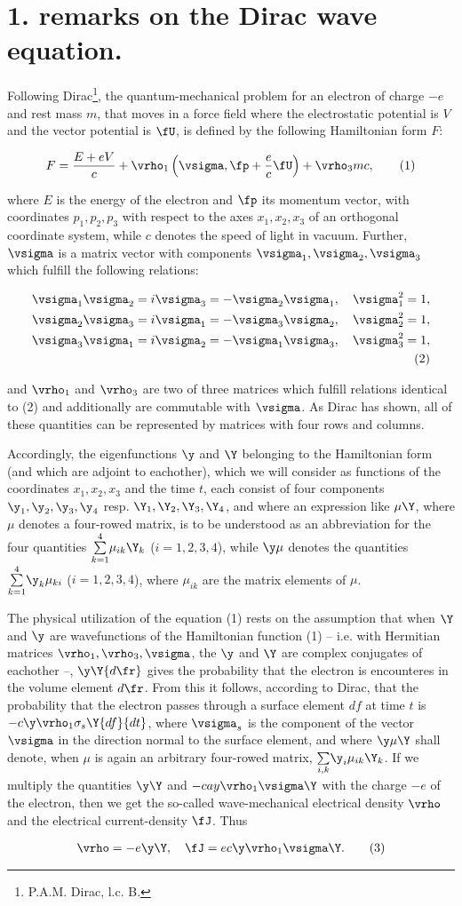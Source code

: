 \documentclass{article}
\newcommand{\nequ}[2]{
\begin{align*}
#1
\tag{#2}
\end{align*}
}
\newcommand{\sumXY}[2]{\underset{#1}{\overset{#2}{\sum}}}
\newcommand{\sumX}[1]{\underset{#1}{\sum}}
\begin{document}
\section*{1.  remarks on the Dirac wave equation.}

Following Dirac\footnote{P.A.M. Dirac, l.c. B.}, the quantum-mechanical problem for an electron of charge $-e$ and rest mass $m$, that moves in a force field where the electrostatic potential is $V$ and the vector potential is $\fU$, is defined by the following Hamiltonian form $F$:
\nequ{
F=\frac{E+eV}{c} + \vrho_1\left(\vsigma, \fp + \frac{e}{c}\fU\right) + \vrho_3 mc,
}{1}
where $E$ is the energy of the electron and $\fp$ its momentum vector, with coordinates $p_1,p_2,p_3$ with respect to the axes $x_1,x_2,x_3$ of an orthogonal coordinate system, while $c$ denotes the speed of light in vacuum. Further, $\vsigma$ is a matrix vector with components $\vsigma_1,\vsigma_2,\vsigma_3$ which fulfill the following relations:
\nequ{
\vsigma_1 \vsigma_2 = i\vsigma_3 = -\vsigma_2 \vsigma_1, \quad \vsigma_1^2 = 1,\\
\vsigma_2 \vsigma_3 = i\vsigma_1 = -\vsigma_3 \vsigma_2, \quad \vsigma_2^2 = 1,\\
\vsigma_3 \vsigma_1 = i\vsigma_2 = -\vsigma_1 \vsigma_3, \quad \vsigma_3^2 = 1,\\
}{2}
and $\vrho_1$ and $\vrho_3$ are two of three matrices which fulfill relations identical to (2) and additionally are commutable with $\vsigma$. As Dirac has shown, all of these quantities can be represented by matrices with four rows and columns.

Accordingly, the eigenfunctions $\y$ and $\Y$ belonging to the Hamiltonian form (and which are adjoint to eachother), which we will consider as functions of the coordinates $x_1,x_2,x_3$ and the time $t$, each consist of four components $\y_1,\y_2,\y_3,\y_4$ resp. $\Y_1,\Y_2,\Y_3,\Y_4$, and where an expression like $\mu\Y$, where $\mu$ denotes a four-rowed matrix, is to be understood as an abbreviation for the four quantities $\sumXY{k=1}{4}\mu_{ik}\Y_k$ ($i=1,2,3,4$), while $\y\mu$ denotes the quantities $\sumXY{k=1}{4}\y_k\mu_{ki}$ ($i=1,2,3,4$), where $\mu_{ik}$ are the matrix elements of $\mu$.

The physical utilization of the equation (1) rests on the assumption that when $\Y$ and $\y$ are  wavefunctions of the Hamiltonian function (1) -- i.e. with Hermitian matrices $\vrho_1, \vrho_3, \vsigma$, the $\y$ and $\Y$ are complex conjugates of eachother --, $\y\Y{d\fr}$ gives the probability that the electron is encounteres in the volume element ${d\fr}$. From this it follows, according to Dirac, that the probability that the electron passes through a surface element ${df}$ at time $t$ is $-c\y\vrho_1\sigma_s\Y{df}{dt}$, where $\vsigma_s$ is the component of the vector $\vsigma$ in the direction normal to the surface element, and where $\y\mu\Y$ shall denote, when $\mu$ is again an arbitrary four-rowed matrix, $\sumX{i,k}\y_i\mu_{ik}\Y_k$. If we multiply the quantities $\y\Y$ and $-cay\vrho_1\vsigma\Y$ with the charge $-e$ of the electron, then we get the so-called wave-mechanical electrical density $\vrho$ and the electrical current-density $\fJ$. Thus
\nequ{
\vrho = -e\y\Y, \quad \fJ = ec\y\vrho_1\vsigma\Y.
}{3}
\end{document}
